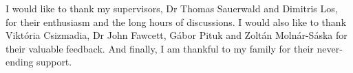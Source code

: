 \begin{acknowledgements}      


I would like to thank my supervisors, Dr Thomas Sauerwald and Dimitris Los, for their enthusiasm and the long hours of discussions. I would also like to thank Viktória Csizmadia, Dr John Fawcett, Gábor Pituk and Zoltán Molnár-Sáska for their valuable feedback. And finally, I am thankful to my family for their never-ending support.


\end{acknowledgements}
